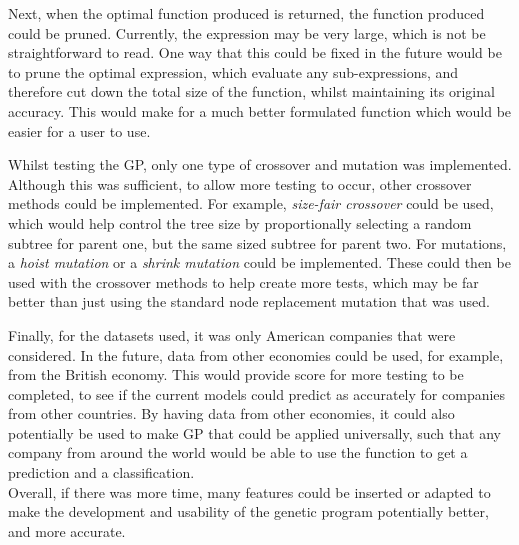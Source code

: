 \documentclass[11pt]{article}
\begin{document}
Next, when the optimal function produced is returned, the function produced could be pruned. Currently, the expression may be very large, which is not be straightforward to read. One way that this could be fixed in the future would be to prune the optimal expression, which evaluate any sub-expressions, and therefore cut down the total size of the function, whilst maintaining its original accuracy. This would make for a much better formulated function which would be easier for a user to use. 

Whilst testing the GP, only one type of crossover and mutation was implemented. Although this was sufficient, to allow more testing to occur, other crossover methods could be implemented. For example, \textit{size-fair crossover} could be used, which would help control the tree size by proportionally selecting a random subtree for parent one, but the same sized subtree for parent two. For mutations, a \textit{hoist mutation} or a \textit{shrink mutation} could be implemented. These could then be used with the crossover methods to help create more tests, which may be far better than just using the standard node replacement mutation that was used. 

Finally, for the datasets used, it was only American companies that were considered. In the future, data from other economies could be used, for example, from the British economy. This would provide score for more testing to be completed, to see if the current models could predict as accurately for companies from other countries. By having data from other economies, it could also potentially be used to make GP that could be applied universally, such that any company from around the world would be able to use the function to get a prediction and a classification. \\

Overall, if there was more time, many features could be inserted or adapted to make the development and usability of the genetic program potentially better, and more accurate.

\cleardoublepage


\end{document}
